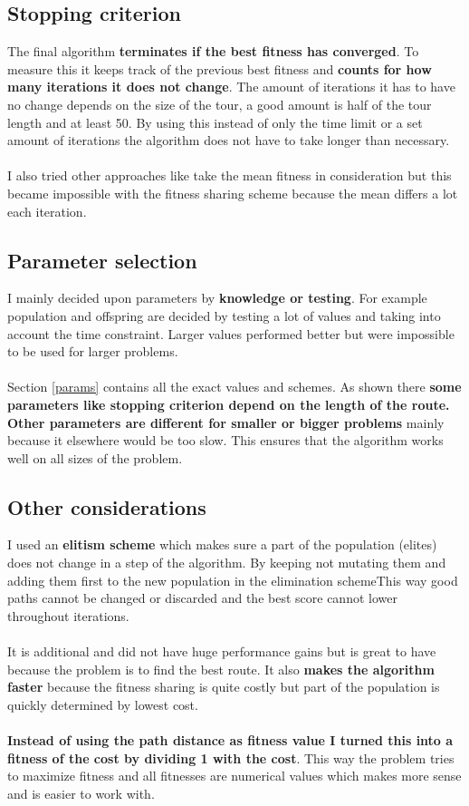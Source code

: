 \documentclass[a4paper,10pt]{article}
\begin{document}
\subsection{Stopping criterion}
The final algorithm \textbf{terminates if the best fitness has converged}. To measure this it keeps track of the previous best fitness and \textbf{counts for how many iterations it does not change}. The amount of iterations it has to have no change depends on the size of the tour, a good amount is half of the tour length and at least 50. By using this instead of only the time limit or a set amount of iterations the algorithm does not have to take longer than necessary.
\\\\
I also tried other approaches like take the mean fitness in consideration but this became impossible with the fitness sharing scheme because the mean differs a lot each iteration. 

\subsection{Parameter selection}
\label{ps}
I mainly decided upon parameters by \textbf{knowledge or testing}. For example population and offspring are decided by testing a lot of values and taking into account the time constraint. Larger values performed better but were impossible to be used for larger problems.
\\\\
Section \ref{params} contains all the exact values and schemes. As shown there \textbf{some parameters like stopping criterion depend on the length of the route. Other parameters are different for smaller or bigger problems} mainly because it elsewhere would be too slow. This ensures that the algorithm works well on all sizes of the problem.

\subsection{Other considerations}
I used an \textbf{elitism scheme} which makes sure a part of the population (elites) does not change in a step of the algorithm. By keeping not mutating them and adding them first to the new population in the elimination schemeThis way good paths cannot be changed or discarded and the best score cannot lower throughout iterations. 
\\\\
It is additional and did not have huge performance gains but is great to have because the problem is to find the best route. It also \textbf{makes the algorithm faster} because the fitness sharing is quite costly but part of the population is quickly determined by lowest cost.
\\\\
\textbf{Instead of using the path distance as fitness value I turned this into a fitness of the cost by dividing 1 with the cost}. This way the problem tries to maximize fitness and all fitnesses are numerical values which makes more sense and is easier to work with.
\end{document}
